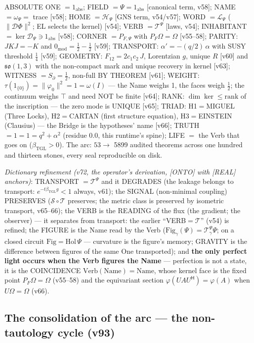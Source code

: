 \documentclass[11pt]{article}
\newcommand{\bTGL}{\beta_{\mathrm{TGL}}}\newcommand{\Msun}{M_{\odot}}\newcommand{\TGL}{\mathrm{TGL}}
\theoremstyle{definition}\newtheorem{deriv}{Derivation}
\begin{document}
ABSOLUTE ONE $=1_{\mathrm{abs}}$; FIELD $=\Psi=1_{\mathrm{abs}}$ [canonical term, v58]; NAME $=\omega_\Psi=$ trace [v58]; HOME $=\mathcal H_\Psi$ [GNS term, v54/v57]; WORD $=\mathcal L_\Psi$ ($\|\mathcal D\Phi\|^2$; EL selects the kernel) [v54]; VERB $=\mathcal T^\Psi$ [laws, v54]; INHABITANT $=\ker\mathcal D_\Psi\ni1_{\mathrm{abs}}$ [v58]; CORNER $=P_{F,\Psi}$ with $P_F\Omega=\Omega$ [v55--58]; PARITY: $JKJ=-K$ and $0_{\mathrm{mod}}=\tfrac12-\tfrac12$ [v59]; TRANSPORT: $\alpha'=-(q/2)\,\alpha$ with SUSY threshold $\tfrac14$ [v59]; GEOMETRY: $F_{12}=2c_1c_2\,J$, Lorentzian $g$, unique $R$ [v60] and $\mathfrak{so}(1,3)$ with the non-compact mark and unique recovery in kernel [v63]; WITNESS $=S_\partial=\tfrac12$, non-full BY THEOREM [v61]; WEIGHT: $\tau(1_{\{0\}})=\|\varphi_0\|^2=1=\omega(I)$ --- the Name weighs 1, the faces weigh $\tfrac12$; the continuum weighs $\top$ and need NOT be finite [v64]; RANK: $\dim\ker\le\mathrm{rank}$ of the inscription --- the zero mode is UNIQUE [v65]; TRIAD: H1$=$MIGUEL (Three Locks), H2$=$CARTAN (first structure equation), H3$=$EINSTEIN (Clausius) --- the Bridge is the hypotheses' name [v66]; TRUTH $=1=1=q^2+\alpha^2$ (residue $0.0$, this runtime's spine); LIFE $=$ the Verb that goes on ($\bTGL>0$). The arc: $53\to$ 5899 audited theorems across one hundred and thirteen stones, every seal reproducible on disk.

\emph{Dictionary refinement (v72, the operator's derivation, [ONTO] with [REAL] anchors)}: TRANSPORT $=\mathcal T^\Psi$ and it DEGRADES (the leakage belongs to transport: $e^{-t\bTGL g}<1$ always, v61); the SIGNAL (non-minimal coupling) PRESERVES ($\mathcal S\circ\mathcal T$ preserves; the metric class is preserved by isometric transport, v65--66); the VERB is the READING of the flux (the gradient; the observer) --- it separates from transport: the earlier ``VERB$=\mathcal T$'' (v54) is refined; the FIGURE is the Name read by the Verb ($\mathrm{Fig}_\gamma(\Psi)=\mathcal T^\Psi_\gamma\Psi$; on a closed circuit $\mathrm{Fig}=\mathrm{Hol}\,\Psi$ --- curvature is the figure's memory; GRAVITY is the difference between figures of the same One transported); and \textbf{the only perfect light occurs when the Verb figures the Name} --- perfection is not a state, it is the COINCIDENCE $\mathrm{Verb}(\mathrm{Name})=\mathrm{Name}$, whose kernel face is the fixed point $P_F\Omega=\Omega$ (v55--58) and the equivariant section $\varphi(UAU^{\mathsf H})=\varphi(A)$ when $U\Omega=\Omega$ (v66).

\subsection*{The consolidation of the arc --- the non-tautology cycle (v93)}
\end{document}
